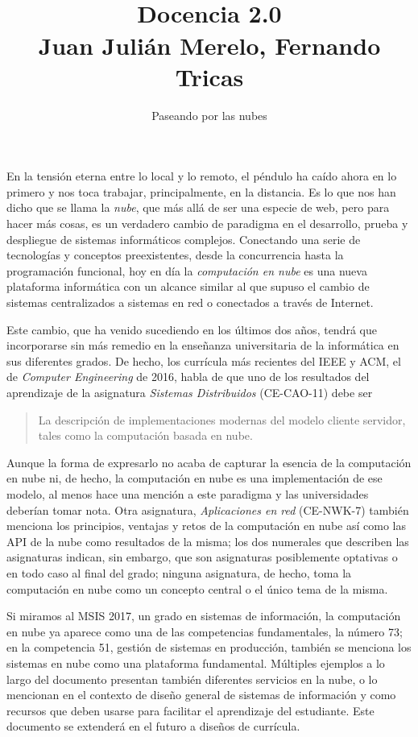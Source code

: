 \documentclass[twoside,10pt]{article}
\title{\ \\ Docencia 2.0\\ \large  Juan Julián Merelo, Fernando 
Tricas}
\author{\LARGE Paseando por las nubes}
\date{}
\newcounter{num}
\begin{document}
\maketitle
\vspace*{-5ex}

\addtocounter{page}{6}
\begin{multicols}{2}

En la tensi\'on eterna entre lo local y lo remoto, el p\'endulo ha
ca\'ido ahora en lo primero y nos toca trabajar, principalmente, en la
distancia.  Es lo que nos han dicho que se llama la {\em nube}, que
m\'as all\'a de ser una especie de web, pero para hacer m\'as cosas,
es un verdadero cambio de paradigma en el desarrollo, prueba y
despliegue de sistemas inform\'aticos complejos.  Conectando una serie
de tecnolog\'ias y conceptos preexistentes, desde la concurrencia
hasta la programaci\'on funcional, hoy en d\'ia la {\em computaci\'on
en nube} es una nueva plataforma inform\'atica con un alcance similar
al que supuso el cambio de sistemas centralizados a sistemas en red o
conectados a trav\'es de Internet.

Este cambio, que ha venido sucediendo en los \'ultimos dos a\~nos, tendr\'a
que incorporarse sin m\'as remedio en la ense\~nanza universitaria de la
inform\'atica en sus diferentes grados. De hecho, los curr\'icula m\'as
recientes del IEEE y ACM, el de {\em Computer Engineering} de 2016, habla de
que uno de los resultados del aprendizaje de la asignatura {\em Sistemas
Distribuidos} (CE-CAO-11) debe ser    
\begin{quote}
  La descripci\'on de implementaciones modernas del modelo cliente
  servidor, tales como la computaci\'on basada en nube.
\end{quote}
Aunque la forma de expresarlo no acaba de capturar la esencia de la
computaci\'on en nube ni, de hecho, la computaci\'on en nube es una
implementaci\'on de ese modelo, al menos hace una menci\'on a este
paradigma y las universidades deber\'ian tomar nota. Otra asignatura,
{\em Aplicaciones en red} (CE-NWK-7) tambi\'en menciona los principios,
ventajas y retos de la computaci\'on en nube as\'i como las API de la
nube como resultados de la misma; los dos numerales que describen las
asignaturas indican, sin embargo, que son asignaturas posiblemente
optativas o en todo caso al final del grado; ninguna asignatura, de
hecho, toma la computaci\'on en nube como un concepto central o el \'unico
tema de la misma. 

Si miramos al MSIS 2017, un grado en sistemas de informaci\'on, la
computaci\'on en nube ya aparece como una de las competencias
fundamentales, la n\'umero 73; en la competencia 51, gesti\'on de
sistemas en producci\'on, tambi\'en se menciona los sistemas en nube como
una plataforma fundamental. M\'ultiples ejemplos a lo largo del
documento presentan tambi\'en diferentes servicios en la nube, o lo
mencionan en el contexto de dise\~no general de sistemas de
informaci\'on y como recursos que deben usarse para facilitar el
aprendizaje del estudiante. Este documento se extender\'a en el futuro a
dise\~nos de curr\'icula. 


\end{multicols}
\end{document}
